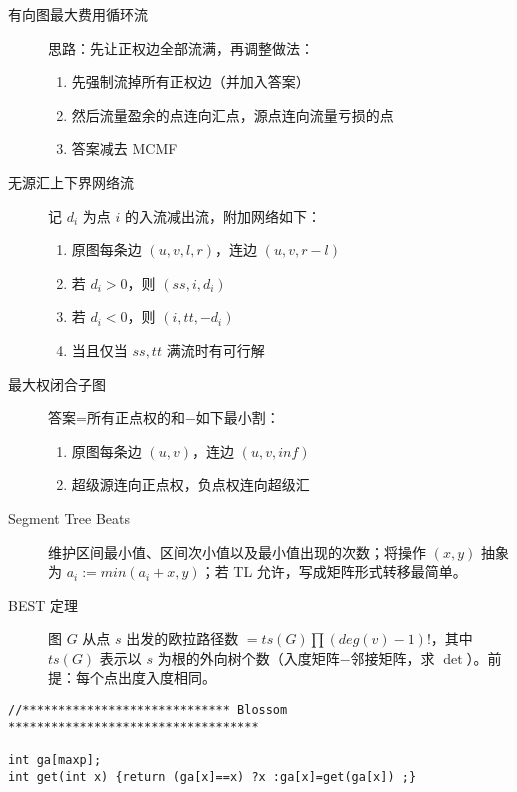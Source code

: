 \documentclass[6pt]{article}
\begin{document}
\begin{multicols}{2}
  \begin{description}
    \item[有向图最大费用循环流] 思路：先让正权边全部流满，再调整做法：
          \begin{enumerate}
            \item 先强制流掉所有正权边（并加入答案）
            \item 然后流量盈余的点连向汇点，源点连向流量亏损的点
            \item 答案减去 MCMF
          \end{enumerate}
    \item[无源汇上下界网络流] 记 $d_i$ 为点 $i$ 的入流减出流，附加网络如下：
          \begin{enumerate}
            \item 原图每条边 $(u,v,l,r)$，连边 $(u,v,r-l)$
            \item 若 $d_i>0$，则 $(ss,i,d_i)$
            \item 若 $d_i<0$，则 $(i,tt,-d_i)$
            \item 当且仅当 $ss,tt$ 满流时有可行解
          \end{enumerate}
    \item[最大权闭合子图] 答案=所有正点权的和−如下最小割：
          \begin{enumerate}
            \item 原图每条边 $(u,v)$，连边 $(u,v,inf)$
            \item 超级源连向正点权，负点权连向超级汇
          \end{enumerate}
    \item[Segment Tree Beats] 维护区间最小值、区间次小值以及最小值出现的次数；将操作 $(x,y)$ 抽象为 $a_i:=min(a_i+x,y)$；若 TL 允许，写成矩阵形式转移最简单。
    \item[BEST 定理] 图 $G$ 从点 $s$ 出发的欧拉路径数 $= ts(G) \prod (deg(v)-1)!$，其中 $ts(G)$ 表示以 $s$ 为根的外向树个数（入度矩阵$-$邻接矩阵，求 $\det$）。前提：每个点出度入度相同。
  \end{description}

  \begin{lstlisting}
//***************************** Blossom ***********************************

int ga[maxp];
int get(int x) {return (ga[x]==x) ?x :ga[x]=get(ga[x]) ;}


\end{lstlisting}
\end{multicols}
\end{document}
